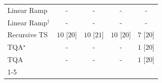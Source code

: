\begin{tabular}{l|cccc|}
Linear Ramp & {\cellcolor[HTML]{000000}} \color[HTML]{F1F1F1} {\cellcolor{white}} \color{black} - & {\cellcolor[HTML]{000000}} \color[HTML]{F1F1F1} {\cellcolor{white}} \color{black} - & {\cellcolor[HTML]{000000}} \color[HTML]{F1F1F1} {\cellcolor{white}} \color{black} - & {\cellcolor[HTML]{000000}} \color[HTML]{F1F1F1} {\cellcolor{white}} \color{black} - \\
Linear Ramp$^\dagger$ & {\cellcolor[HTML]{000000}} \color[HTML]{F1F1F1} {\cellcolor{white}} \color{black} - & {\cellcolor[HTML]{000000}} \color[HTML]{F1F1F1} {\cellcolor{white}} \color{black} - & {\cellcolor[HTML]{000000}} \color[HTML]{F1F1F1} {\cellcolor{white}} \color{black} - & {\cellcolor[HTML]{000000}} \color[HTML]{F1F1F1} {\cellcolor{white}} \color{black} - \\
Recursive TS & {\cellcolor[HTML]{00441B}} \color[HTML]{F1F1F1} $10$ [$20$] & {\cellcolor[HTML]{00441B}} \color[HTML]{F1F1F1} $10$ [$21$] & {\cellcolor[HTML]{00441B}} \color[HTML]{F1F1F1} $10$ [$20$] & {\cellcolor[HTML]{37A055}} \color[HTML]{F1F1F1} $7$ [$20$] \\
TQA$^\star$ & {\cellcolor[HTML]{000000}} \color[HTML]{F1F1F1} {\cellcolor{white}} \color{black} - & {\cellcolor[HTML]{000000}} \color[HTML]{F1F1F1} {\cellcolor{white}} \color{black} - & {\cellcolor[HTML]{000000}} \color[HTML]{F1F1F1} {\cellcolor{white}} \color{black} - & {\cellcolor[HTML]{F7FCF5}} \color[HTML]{000000} $1$ [$20$] \\
TQA & {\cellcolor[HTML]{000000}} \color[HTML]{F1F1F1} {\cellcolor{white}} \color{black} - & {\cellcolor[HTML]{000000}} \color[HTML]{F1F1F1} {\cellcolor{white}} \color{black} - & {\cellcolor[HTML]{000000}} \color[HTML]{F1F1F1} {\cellcolor{white}} \color{black} - & {\cellcolor[HTML]{F7FCF5}} \color[HTML]{000000} $1$ [$20$] \\
\cline{1-5}
\bottomrule
\end{tabular}
